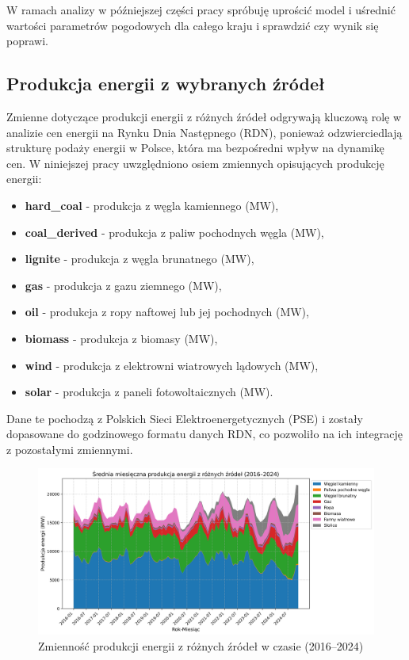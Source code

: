 W ramach analizy w późniejszej części pracy spróbuję uprościć model i uśrednić wartości parametrów pogodowych dla całego kraju i sprawdzić czy wynik się poprawi. 

\subsection{Produkcja energii z wybranych źródeł}
Zmienne dotyczące produkcji energii z różnych źródeł odgrywają kluczową rolę w analizie cen energii na Rynku Dnia Następnego (RDN), ponieważ odzwierciedlają strukturę podaży energii w Polsce, która ma bezpośredni wpływ na dynamikę cen. W niniejszej pracy uwzględniono osiem zmiennych opisujących produkcję energii: 
\begin{itemize}
    \item \textbf{hard\_coal} - produkcja z węgla kamiennego (MW),
    \item \textbf{coal\_derived} - produkcja z paliw pochodnych węgla (MW),
    \item \textbf{lignite} - produkcja z węgla brunatnego (MW),
    \item \textbf{gas} - produkcja z gazu ziemnego (MW),
    \item \textbf{oil} - produkcja z ropy naftowej lub jej pochodnych (MW),
    \item \textbf{biomass} - produkcja z biomasy (MW),
    \item \textbf{wind} - produkcja z elektrowni wiatrowych lądowych (MW),
    \item \textbf{solar} - produkcja z paneli fotowoltaicznych (MW).
\end{itemize}

Dane te pochodzą z Polskich Sieci Elektroenergetycznych (PSE) i zostały dopasowane do godzinowego formatu danych RDN, co pozwoliło na ich integrację z pozostałymi zmiennymi. 
\begin{figure}[H]
    \centering
    \includegraphics[width=1.1\textwidth]{../plots/data/energy_production_time_series_full.png}
    \caption{Zmienność produkcji energii z różnych źródeł w czasie (2016–2024)}
    \label{fig:energy-production-time-series-full}
\end{figure}

